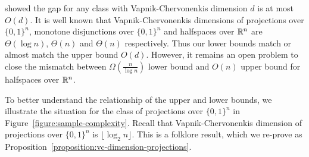 \cite{Darnstadt-Simon-Szorenyi-2013} showed the gap for any class with
Vapnik-Chervonenkis dimension $d$ is at most $O(d)$. It is well known that
Vapnik-Chervonenkis dimensions of projections over $\{0,1\}^n$, monotone
disjunctions over $\{0,1\}^n$ and halfspaces over $\mathbb{R}^n$ are $\Theta(\log n)$,
$\Theta(n)$ and $\Theta(n)$ respectively. Thus our lower bounds match or almost
match the upper bound $O(d)$. However, it remains an open problem to close the
mismatch between $\Omega(\frac{n}{\log n})$ lower bound and $O(n)$ upper bound
for halfspaces over $\mathbb{R}^n$.

To better understand the relationship of the upper and lower bounds, we
illustrate the situation for the class of projections over $\{0,1\}^n$ in
Figure~\ref{figure:sample-complexity}. Recall that Vapnik-Chervonenkis dimension
of projections over $\{0,1\}^n$ is $\lfloor \log_2 n \rfloor$. This is a
folklore result, which we re-prove as
Proposition~\ref{proposition:vc-dimension-projections}.

